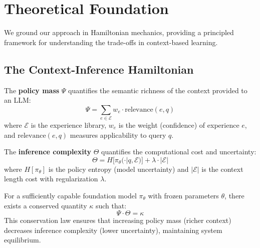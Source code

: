 \section{Theoretical Foundation}

\label{sec:theory}

We ground our approach in Hamiltonian mechanics, providing a principled framework for understanding the trade-offs in context-based learning.

\subsection{The Context-Inference Hamiltonian}

\begin{definition}
The \textbf{policy mass} $\Psi$ quantifies the semantic richness of the context provided to an LLM:
\begin{equation}
\Psi = \sum_{e \in \mathcal{E}} w_e \cdot \text{relevance}(e, q)
\end{equation}
where $\mathcal{E}$ is the experience library, $w_e$ is the weight (confidence) of experience $e$, and $\text{relevance}(e, q)$ measures applicability to query $q$.
\end{definition}

\begin{definition}
The \textbf{inference complexity} $\Theta$ quantifies the computational cost and uncertainty:
\begin{equation}
\Theta = H[\pi_\theta(\cdot | q, \mathcal{E})] + \lambda \cdot |\mathcal{E}|
\end{equation}
where $H[\pi_\theta]$ is the policy entropy (model uncertainty) and $|\mathcal{E}|$ is the context length cost with regularization $\lambda$.
\end{definition}

\begin{theorem}
For a sufficiently capable foundation model $\pi_\theta$ with frozen parameters $\theta$, there exists a conserved quantity $\kappa$ such that:
\begin{equation}
\Psi \cdot \Theta = \kappa
\end{equation}
This conservation law ensures that increasing policy mass (richer context) decreases inference complexity (lower uncertainty), maintaining system equilibrium.
\end{theorem}

